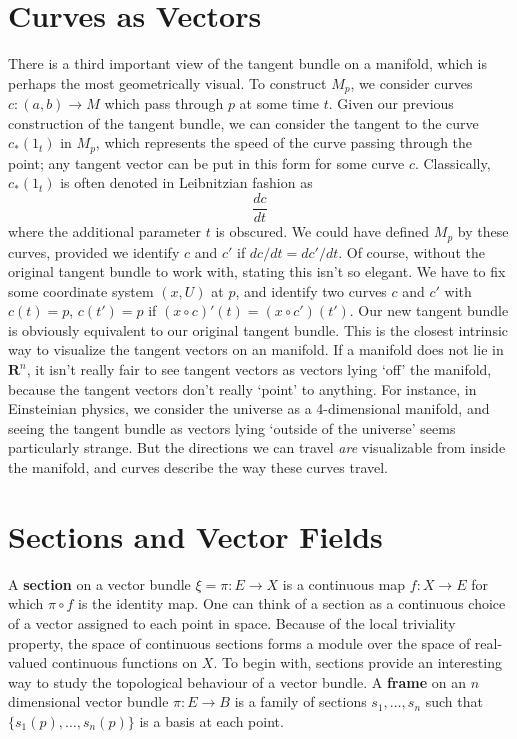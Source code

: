 \section{Curves as Vectors}

There is a third important view of the tangent bundle on a manifold, which is perhaps the most geometrically visual. To construct $M_p$, we consider curves $c: (a,b) \to M$ which pass through $p$ at some time $t$. Given our previous construction of the tangent bundle, we can consider the tangent to the curve $c_*(1_t)$ in $M_p$, which represents the speed of the curve passing through the point; any tangent vector can be put in this form for some curve $c$. Classically, $c_*(1_t)$ is often denoted in Leibnitzian fashion as
%
\[ \frac{dc}{dt} \]
%
where the additional parameter $t$ is obscured. We could have defined $M_p$ by these curves, provided we identify $c$ and $c'$ if $dc/dt = dc'/dt$. Of course, without the original tangent bundle to work with, stating this isn't so elegant. We have to fix some coordinate system $(x,U)$ at $p$, and identify two curves $c$ and $c'$ with $c(t) = p$, $c(t') = p$ if $(x \circ c)'(t) = (x \circ c')(t')$. Our new tangent bundle is obviously equivalent to our original tangent bundle. This is the closest intrinsic way to visualize the tangent vectors on an manifold. If a manifold does not lie in $\mathbf{R}^n$, it isn't really fair to see tangent vectors as vectors lying `off' the manifold, because the tangent vectors don't really `point' to anything. For instance, in Einsteinian physics, we consider the universe as a 4-dimensional manifold, and seeing the tangent bundle as vectors lying `outside of the universe' seems particularly strange. But the directions we can travel {\it are} visualizable from inside the manifold, and curves describe the way these curves travel.

\section{Sections and Vector Fields}

A {\bf section} on a vector bundle $\xi = \pi: E \to X$ is a continuous map $f:X \to E$ for which $\pi \circ f$ is the identity map. One can think of a section as a continuous choice of a vector assigned to each point in space. Because of the local triviality property, the space of continuous sections forms a module over the space of real-valued continuous functions on $X$. To begin with, sections provide an interesting way to study the topological behaviour of a vector bundle. A {\bf frame} on an $n$ dimensional vector bundle $\pi: E \to B$ is a family of sections $s_1, \dots, s_n$ such that $\{ s_1(p), \dots, s_n(p) \}$ is a basis at each point.

